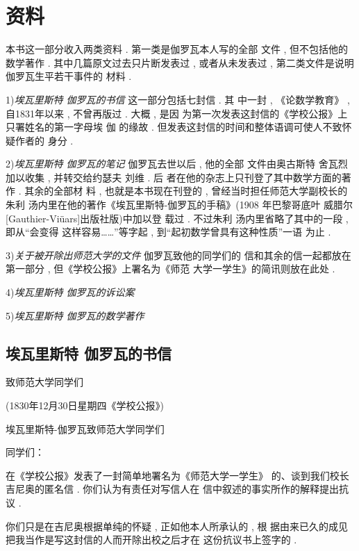 \chapter{资料}

本书这一部分收入两类资料 . 第一类是伽罗瓦本人写的全部 文件 , 但不包括他的数学著作 . 其中几篇原文过去只片断发表过 ,  或者从未发表过 , 第二类文件是说明伽罗瓦生平若干事件的 材料 . 

1)\emph{埃瓦里斯特 \textbullet 伽罗瓦的书信} \quad 这一部分包括七封信 . 其 中一封 , 《论数学教育》 , 自1831年以来 , 不曾再版过 . 大概 , 是因 为第一次发表这封信的《学校公报》上只署姓名的第一字母埃 \textbullet 伽 的缘故 . 但发表这封信的时间和整体语调可使人不致怀疑作者的 身分 . 

2)\emph{埃瓦里斯特 \textbullet 伽罗瓦的笔记}  \quad 伽罗瓦去世以后 , 他的全部 文件由奥古斯特 \textbullet 舍瓦烈加以收集 , 并转交给约瑟夫 \textbullet 刘维 . 后 者在他的杂志上只刊登了其中数学方面的著作 . 其余的全部材 料 , 也就是本书现在刊登的 , 曾经当时担任师范大学副校长的 朱利 \textbullet 汤内里在他的著作《埃瓦里斯特-伽罗瓦的手稿》(1908 年巴黎哥底叶 \textbullet 威腊尔[Gauthier-Viüars]出版社版)中加以登 载过 . 不过朱利 \textbullet 汤内里省略了其中的一段 , 即从“会变得 这样容易……”等字起 , 到“起初数学曾具有这种性质”一语 为止 . 

3)\emph{关于被开除出师范大学的文件}  \quad 伽罗瓦致他的同学们的 信和其余的信一起都放在第一部分 , 但《学校公报》上署名为《师范 大学一学生》的简讯则放在此处 . 

4)\emph{埃瓦里斯特  \textbullet 伽罗瓦的诉讼案}

5)\emph{埃瓦里斯特 \textbullet 伽罗瓦的数学著作}

\section{埃瓦里斯特 \textbullet 伽罗瓦的书信}
\begin{center}
	致师范大学同学们

(1830年12月30日星期四《学校公报》)

埃瓦里斯特-伽罗瓦致师范大学同学们
\end{center}

同学们：

在《学校公报》发表了一封简单地署名为《师范大学一学生》 的、谈到我们校长吉尼奥的匿名信 . 你们认为有责任对写信人在 信中叙述的事实所作的解释提出抗议 . 

你们只是在吉尼奥根据单纯的怀疑 , 正如他本人所承认的 , 根 据由来已久的成见把我当作是写这封信的人而开除出校之后才在 这份抗议书上签字的 . 

